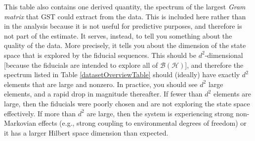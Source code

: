 \documentclass{article}[11pt]
\begin{document}
This table also contains one derived quantity, the spectrum of the largest \emph{Gram matrix} that GST could extract from the data.  This is included here rather than in the analysis because it is not useful for predictive purposes, and therefore is not part of the estimate.  It serves, instead, to tell you something about the quality of the data.  More precisely, it tells you about the dimension of the state space that is explored by the fiducial sequences.  This should be $d^2$-dimensional [because the fiducials are intended to explore all of $\mathcal{B}(\mathcal{H})$], and therefore the spectrum listed in Table \ref{datasetOverviewTable} should (ideally) have exactly $d^2$ elements that are large and nonzero.  In practice, you should see $d^2$ large elements, and a rapid drop in magnitude thereafter.  If fewer than $d^2$ elements are large, then the fiducials were poorly chosen and are not exploring the state space effectively.  If more than $d^2$ are large, then the system is experiencing strong non-Markovian effects (e.g., strong coupling to environmental degrees of freedom) or it has a larger Hilbert space dimension than expected.
\end{document}
